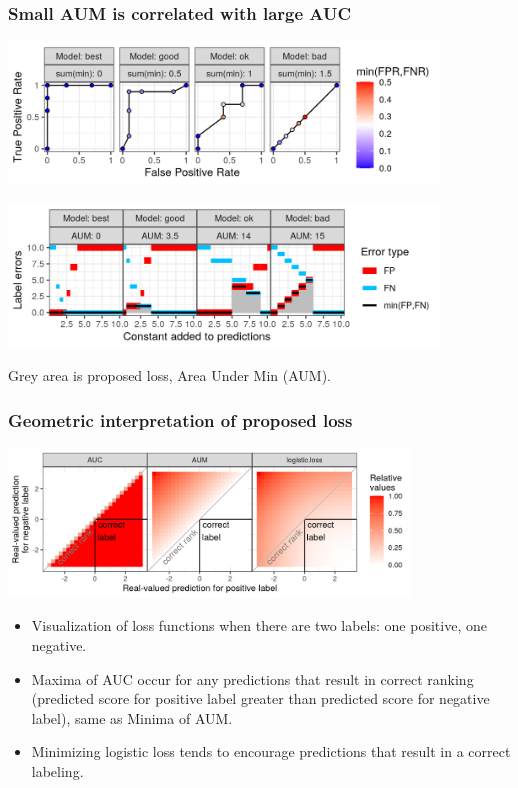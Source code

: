 \documentclass[t]{beamer}
\begin{document}
\begin{frame}
  \frametitle{Small AUM is correlated with large AUC} 
  
  \includegraphics[height=1.5in]{figure-more-than-one-binary-dots}

  \includegraphics[height=1.5in]{figure-more-than-one-binary-aum}

  Grey area is proposed loss, Area Under Min (AUM).
  
\end{frame}

\begin{frame}
  \frametitle{Geometric interpretation of proposed loss}
  
    \centering
    \includegraphics[width=0.8\textwidth]{figure-compare-hinge-loss}

    \begin{itemize}
    \item Visualization of loss functions when there are two labels: one
      positive, one negative.
    \item Maxima of AUC occur for any predictions that result in
      correct ranking (predicted score for positive label greater than
      predicted score for negative label), same as Minima of AUM.
    \item Minimizing logistic loss tends to encourage predictions that
      result in a correct labeling.
    \end{itemize}
\end{frame}
\end{document}
